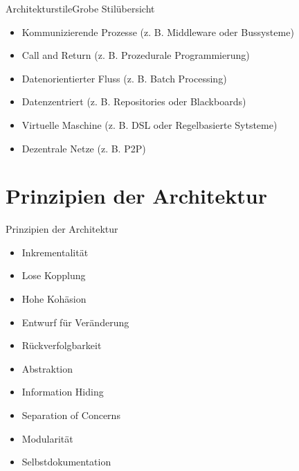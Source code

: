\documentclass{beamer}
\begin{document}
\begin{frame}{Architekturstile}{Grobe Stilübersicht}
	\begin{itemize}
		\item Kommunizierende Prozesse (z. B. Middleware oder Bussysteme)
		\item Call and Return (z. B. Prozedurale Programmierung)
		\item Datenorientierter Fluss (z. B. Batch Processing)
		\item Datenzentriert (z. B. Repositories oder Blackboards)
		\item Virtuelle Maschine (z. B. DSL oder Regelbasierte Sytsteme)
		\item Dezentrale Netze (z. B. P2P)
	\end{itemize}


\end{frame}

\section{Prinzipien der Architektur}

\begin{frame}{Prinzipien der Architektur}


	\begin{itemize}
		\item{Inkrementalität} %
		\item{Lose Kopplung} %
		\item{Hohe Kohäsion} %
		\item{Entwurf für Veränderung} %
		\item{Rückverfolgbarkeit} %
		\item{Abstraktion} %
		\item{Information Hiding} %
		\item{Separation of Concerns} %
		\item{Modularität} %
		\item{Selbstdokumentation} %
	\end{itemize}
\end{frame}
\end{document}
